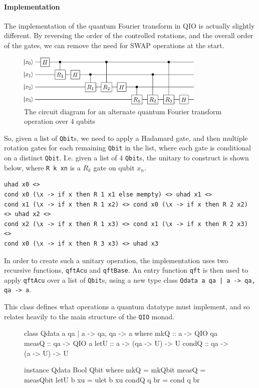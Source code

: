 \documentclass[a4paper,10pt, titlepage, twoside]{article}
\begin{document}
\paragraph{Implementation}
The implementation of the quantum Fourier transform in QIO is actually slightly different. By reversing the order of the controlled rotations, and the overall order of the gates, we can remove the need for SWAP operations at the start.
\begin{figure}[H]
    \centering
    \includegraphics[width=0.8\textwidth]{qft2}
    \caption{The circuit diagram for an alternate quantum Fourier transform operation over 4 qubits}
\end{figure}

So, given a list of \texttt{Qbit}s, we need to apply a Hadamard gate, and then multiple rotation gates for each remaining \texttt{Qbit} in the list, where each gate is conditional on a distinct \texttt{Qbit}. I.e. given a list of 4 \texttt{Qbit}s, the unitary to construct is shown below, where \texttt{R k xn} is a $R_k$ gate on qubit $x_n$.
\begin{verbatim}
uhad x0 <> 
cond x0 (\x -> if x then R 1 x1 else mempty) <> uhad x1 <>
cond x1 (\x -> if x then R 1 x2) <> cond x0 (\x -> if x then R 2 x2) <> uhad x2 <>
cond x2 (\x -> if x then R 1 x3) <> cond x1 (\x -> if x then R 2 x3) <> 
cond x0 (\x -> if x then R 3 x3) <> uhad x3
\end{verbatim}

In order to create such a unitary operation, the implementation uses two recursive functions, \texttt{qftAcu} and \texttt{qftBase}. An entry function \texttt{qft} is then used to apply \texttt{qftAcu} over a list of \texttt{Qbit}s, using a new type class \texttt{Qdata a qa | a -> qa, qa -> a}.\par
This class defines what operations a quantum datatype must implement, and so relates heavily to the main structure of the \texttt{QIO} monad. \par
\begin{figure}[H]
    \centering
    \begin{minipage}[b]{0.54\textwidth}
        \begin{verbbox}
class Qdata a qa | a -> qa, qa -> a where
  mkQ :: a -> QIO qa
  measQ :: qa -> QIO a
  letU :: a -> (qa -> U) -> U
  condQ :: qa -> (a -> U) -> U
        \end{verbbox}
        \theverbbox
    \end{minipage}
     \begin{minipage}[b]{0.45\textwidth}
        \begin{verbbox}
instance Qdata Bool Qbit where
    mkQ = mkQbit
    measQ = measQbit
    letU b xu = ulet b xu
    condQ q br = cond q br
        \end{verbbox}
        \theverbbox
    \end{minipage}
\end{figure}
\end{document}

